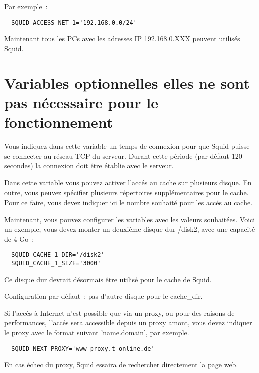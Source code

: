 \begin{description}
                Par exemple~:
\begin{verbatim}
  SQUID_ACCESS_NET_1='192.168.0.0/24'
\end{verbatim}

                Maintenant tous les PCs avec les adresses IP 192.168.0.XXX
                peuvent utilisés Squid.


\section{Variables optionnelles elles ne sont pas nécessaire pour le fonctionnement}


                Vous indiquez dans cette variable un temps de connexion pour
                que Squid puisse se connecter au réseau TCP du serveur. Durant
                cette période (par défaut 120 secondes) la connexion doit être
                établie avec le serveur.


                Dans cette variable vous pouvez activer l'accés au cache sur
                plusieurs disque. En outre, vous peuvez spécifier plusieurs
                répertoires supplémentaires pour le cache. Pour ce faire, vous
                devez indiquer ici le nombre souhaité pour les accés au cache.

                Maintenant, vous pouvez configurer les variables
                avec les valeurs souhaitées. Voici un exemple, vous devez monter
                un deuxième disque dur /disk2, avec une capacité de 4 Go~:

\begin{verbatim}
  SQUID_CACHE_1_DIR='/disk2'
  SQUID_CACHE_1_SIZE='3000'
\end{verbatim}
                Ce disque dur devrait désormais être utilisé pour le cache
                de Squid.

                Configuration par défaut~: pas d'autre disque pour le cache\_dir.



                Si l'accès à Internet n'est possible que via un proxy, ou pour
                des raisons de performances, l'accés sera accessible depuis un
                proxy amont, vous devez indiquer le proxy avec le format suivant
                'name.domain', par exemple.
\begin{verbatim}
  SQUID_NEXT_PROXY='www-proxy.t-online.de'
\end{verbatim}
                En cas échec du proxy, Squid essaira de rechercher
                directement la page web.


\end{description}
